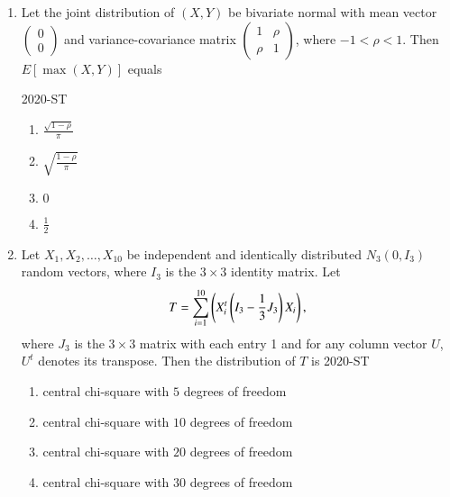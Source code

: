 \documentclass[journal]{IEEEtran}
\begin{document}
\begin{enumerate}
\item Let the joint distribution of $(X, Y)$ be bivariate normal with mean vector $\begin{pmatrix} 0 \\ 0 \end{pmatrix}$ and variance-covariance matrix $\begin{pmatrix} 1 & \rho \\ \rho & 1 \end{pmatrix}$, where $-1 < \rho < 1$. Then $E \left[ \max(X, Y) \right]$ equals

\hfill{2020-ST}
\begin{enumerate}
    \item $\frac{\sqrt{1 - \rho}}{\pi}$
    \item $\sqrt{\frac{1 - \rho}{\pi}}$
    \item $0$
    \item $\frac{1}{2}$
\end{enumerate}

\item Let $X_1, X_2, \dots, X_{10}$ be independent and identically distributed $N_3(0, I_3)$ random vectors, where $I_3$ is the $3 \times 3$ identity matrix. Let
\begin{align*}
T = \sum_{i=1}^{10} \left( X_i^t \left( I_3 - \frac{1}{3} J_3 \right) X_i\right),
\end{align*}
where $J_3$ is the $3 \times 3$ matrix with each entry 1 and for any column vector $U$, $U^t$ denotes its transpose. Then the distribution of $T$ is
\hfill{2020-ST}
\begin{enumerate}
    \item central chi-square with $5$ degrees of freedom
    \item central chi-square with $10$ degrees of freedom
    \item central chi-square with $20$ degrees of freedom
    \item central chi-square with $30$ degrees of freedom
\end{enumerate}


\end{enumerate}
\end{document}
